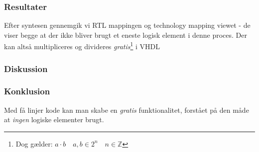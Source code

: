 \subsubsection{Resultater}


Efter syntesen gennemgik vi RTL mappingen og technology mapping viewet - de viser begge at der ikke bliver brugt et eneste logisk element i denne proces. Der kan altså multipliceres og divideres \emph{gratis}\footnote{Dog gælder: $a\cdot b \quad a,b \in 2^n \quad n \in \mathbb{Z}$} i VHDL



\subsubsection{Diskussion}

\subsubsection{Konklusion}

Med få linjer kode kan man skabe en \emph{gratis} funktionalitet, forstået på den måde at \textit{ingen} logiske elementer brugt.

